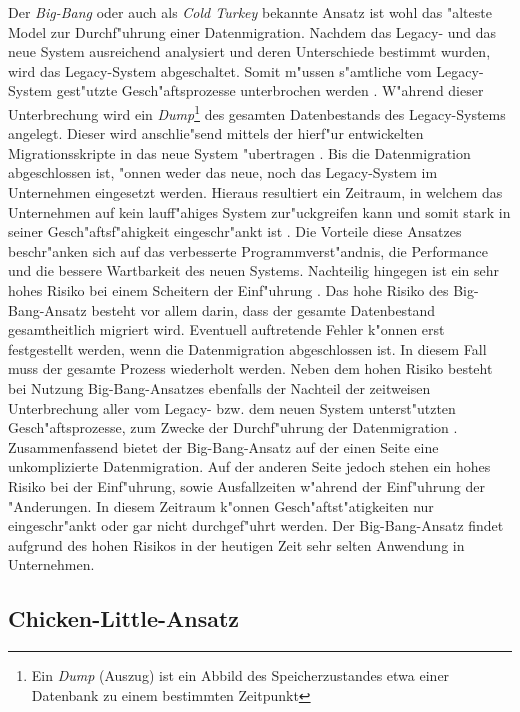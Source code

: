 Der \textit{Big-Bang} oder auch als \textit{Cold Turkey} bekannte Ansatz ist wohl das "alteste Model zur Durchf"uhrung einer Datenmigration. Nachdem das Legacy- und das neue System ausreichend analysiert und deren Unterschiede bestimmt wurden, wird das Legacy-System abgeschaltet. Somit m"ussen s"amtliche vom Legacy-System gest"utzte Gesch"aftsprozesse unterbrochen werden \citep[S.~4]{wuLawless-1997}. 
\lb
W"ahrend dieser Unterbrechung wird ein \textit{Dump}\footnote{Ein \textit{Dump} (Auszug) ist ein Abbild des Speicherzustandes etwa einer Datenbank zu einem bestimmten Zeitpunkt} des gesamten Datenbestands des Legacy-Systems angelegt. Dieser wird anschlie"send mittels der hierf"ur entwickelten Migrationsskripte in das neue System "ubertragen \citep[S.~3]{brodie-1993}. Bis die Datenmigration abgeschlossen ist, "onnen weder das neue, noch das Legacy-System im Unternehmen eingesetzt werden. Hieraus resultiert ein Zeitraum, in welchem das Unternehmen auf kein lauff"ahiges System zur"uckgreifen kann und somit stark in seiner Gesch"aftsf"ahigkeit eingeschr"ankt ist \citep[S.~3f.]{brodie-1993}.
\lb
Die Vorteile diese Ansatzes beschr"anken sich auf das verbesserte Programmverst"andnis, die Performance und die bessere Wartbarkeit des neuen Systems. Nachteilig hingegen ist ein sehr hohes Risiko bei einem Scheitern der Einf"uhrung \citep[S.~105]{bisbal-1999}. Das hohe Risiko des Big-Bang-Ansatz besteht vor allem darin, dass der gesamte Datenbestand gesamtheitlich migriert wird. Eventuell auftretende Fehler k"onnen erst festgestellt werden, wenn die Datenmigration abgeschlossen ist. In diesem Fall muss der gesamte Prozess wiederholt werden. Neben dem hohen Risiko besteht bei Nutzung Big-Bang-Ansatzes ebenfalls der Nachteil der zeitweisen Unterbrechung aller vom Legacy- bzw. dem neuen System unterst"utzten Gesch"aftsprozesse, zum Zwecke der Durchf"uhrung der Datenmigration \citep[S.~4]{wuLawless-1997}.
\lb
Zusammenfassend bietet der Big-Bang-Ansatz auf der einen Seite eine unkomplizierte Datenmigration. Auf der anderen Seite jedoch stehen ein hohes Risiko bei der Einf"uhrung, sowie Ausfallzeiten w"ahrend der Einf"uhrung der "Anderungen. In diesem Zeitraum k"onnen Gesch"aftst"atigkeiten nur eingeschr"ankt oder gar nicht durchgef"uhrt werden. Der Big-Bang-Ansatz findet aufgrund des hohen Risikos in der heutigen Zeit sehr selten Anwendung in Unternehmen.

\subsection{Chicken-Little-Ansatz}

